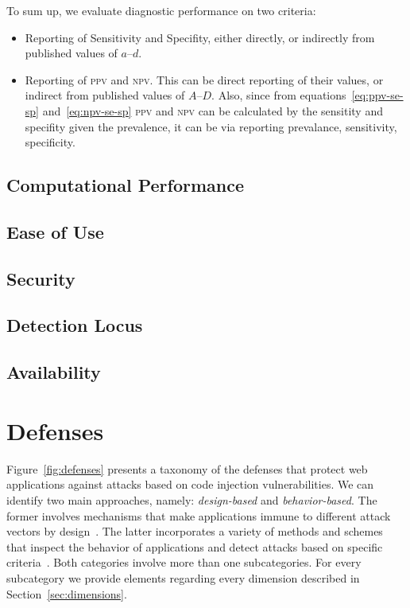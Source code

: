 \documentclass[conference]{IEEEtran}
\begin{document}
To sum up, we evaluate diagnostic performance on two criteria:

\begin{itemize}
\item Reporting of Sensitivity and Specifity, either directly, or
  indirectly from published values of $a$--$d$.
\item Reporting of \textsc{ppv} and \textsc{npv}. This can be direct
  reporting of their values, or indirect from published values of
  $A$--$D$. Also, since from equations~\ref{eq:ppv-se-sp}
  and~\ref{eq:npv-se-sp} \textsc{ppv} and \textsc{npv} can be
  calculated by the sensitity and specifity given the prevalence, it
  can be via reporting prevalance, sensitivity, specificity.
\end{itemize}
 
\subsection{Computational Performance}

\subsection{Ease of Use}

\subsection{Security}

\subsection{Detection Locus}

\subsection{Availability}

\section{Defenses}
\label{sec:defs}

Figure~\ref{fig:defenses} presents a taxonomy of the
defenses that protect web applications against attacks based on
code injection vulnerabilities.
We can identify two main approaches, namely:
{\it design-based} and {\it behavior-based}.
The former involves mechanisms that make applications
immune to different attack vectors by design~\cite{JL75,L81}.
The latter incorporates a variety of methods and
schemes that inspect the behavior of applications
and detect attacks based on specific criteria~\cite{D76,A00}.
Both categories involve more than one subcategories.
For every subcategory we provide elements regarding
every dimension described in Section~\ref{sec:dimensions}.
\end{document}
